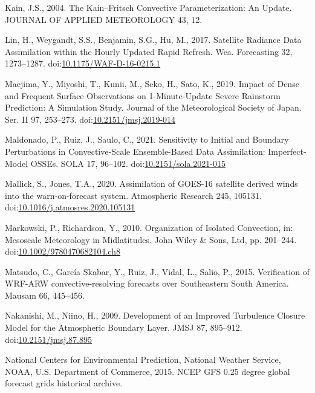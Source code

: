 \documentclass[authoryear,preprint,review,12pt]{elsarticle} %
\begin{document}
\leavevmode\hypertarget{ref-kain2004}{}%
Kain, J.S., 2004. The Kain--Fritsch Convective Parameterization: An Update. JOURNAL OF APPLIED METEOROLOGY 43, 12.

\leavevmode\hypertarget{ref-lin2017a}{}%
Lin, H., Weygandt, S.S., Benjamin, S.G., Hu, M., 2017. Satellite Radiance Data Assimilation within the Hourly Updated Rapid Refresh. Wea. Forecasting 32, 1273--1287. doi:\href{https://doi.org/10.1175/WAF-D-16-0215.1}{10.1175/WAF-D-16-0215.1}

\leavevmode\hypertarget{ref-maejima2019}{}%
Maejima, Y., Miyoshi, T., Kunii, M., Seko, H., Sato, K., 2019. Impact of Dense and Frequent Surface Observations on 1-Minute-Update Severe Rainstorm Prediction: A Simulation Study. Journal of the Meteorological Society of Japan. Ser. II 97, 253--273. doi:\href{https://doi.org/10.2151/jmsj.2019-014}{10.2151/jmsj.2019-014}

\leavevmode\hypertarget{ref-maldonado2021}{}%
Maldonado, P., Ruiz, J., Saulo, C., 2021. Sensitivity to Initial and Boundary Perturbations in Convective-Scale Ensemble-Based Data Assimilation: Imperfect-Model OSSEs. SOLA 17, 96--102. doi:\href{https://doi.org/10.2151/sola.2021-015}{10.2151/sola.2021-015}

\leavevmode\hypertarget{ref-mallick2020}{}%
Mallick, S., Jones, T.A., 2020. Assimilation of GOES-16 satellite derived winds into the warn-on-forecast system. Atmospheric Research 245, 105131. doi:\href{https://doi.org/10.1016/j.atmosres.2020.105131}{10.1016/j.atmosres.2020.105131}

\leavevmode\hypertarget{ref-markowski2010}{}%
Markowski, P., Richardson, Y., 2010. Organization of Isolated Convection, in: Mesoscale Meteorology in Midlatitudes. John Wiley \& Sons, Ltd, pp. 201--244. doi:\href{https://doi.org/10.1002/9780470682104.ch8}{10.1002/9780470682104.ch8}

\leavevmode\hypertarget{ref-matsudo2015}{}%
Matsudo, C., García Skabar, Y., Ruiz, J., Vidal, L., Salio, P., 2015. Verification of WRF-ARW convective-resolving forecasts over Southeastern South America. Mausam 66, 445--456.

\leavevmode\hypertarget{ref-nakanishi2009}{}%
Nakanishi, M., Niino, H., 2009. Development of an Improved Turbulence Closure Model for the Atmospheric Boundary Layer. JMSJ 87, 895--912. doi:\href{https://doi.org/10.2151/jmsj.87.895}{10.2151/jmsj.87.895}

\leavevmode\hypertarget{ref-cisl_rda_ds084.1}{}%
National Centers for Environmental Prediction, National Weather Service, NOAA, U.S. Department of Commerce, 2015. NCEP GFS 0.25 degree global forecast grids historical archive.
\end{document}
